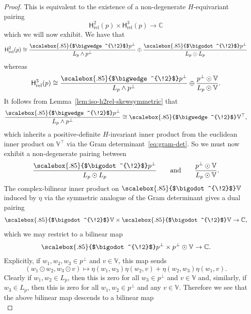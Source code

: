 \documentclass[11pt,reqno,a4paper,final]{amsart}
\newcommand\ext[1]{\scalebox{.85}{$\bigwedge^{\!#1}$}}
\newcommand\sym[1]{\scalebox{.85}{$\bigodot^{\!#1}$}}
\theoremstyle{plain}
\theoremstyle{definition}
\newcommand{\Hrel}{\mathsf{H}_{\mathrm{rel}}}
\newcommand{\VV}{\mathbb{V}}
\newcommand{\CC}{\mathbb{C}}
\newcommand{\1}{\mathbb{1}}
\numberwithin{equation}{section}
\begin{document}
\begin{proof}
  This is equivalent to the existence of a non-degenerate
  $H$-equivariant pairing
  \begin{equation}
    \Hrel^2(p) \times \Hrel^3(p) \to \CC
  \end{equation}
  which we will now exhibit.  We have that
  \begin{equation}
    \Hrel^2(p) \cong \dfrac{\ext{2} p^\perp}{L_p \wedge p^\perp} \oplus \dfrac{\sym{2} p^\perp}{L_p \odot L_p}
  \end{equation}
  whereas
  \begin{equation}
    \Hrel^3(p) \cong \dfrac{\ext{2} p^\perp}{L_p \wedge p^\perp} \oplus \dfrac{p^\perp \odot \VV}{L_p \odot \VV}.
  \end{equation}
  It follows from Lemma~\ref{lem:iso-h2rel-skewsymmetric} that
  \begin{equation}
    \dfrac{\ext{2}p^\perp}{L_p \wedge p^\perp} \cong \ext{2} \VV^\top,
  \end{equation}
  which inherits a positive-definite $H$-invariant inner product from
  the euclidean inner product on $\VV^\top$ via the Gram
  determinant~\eqref{eq:gram-det}.  So we must now exhibit a
  non-degenerate pairing between
  \begin{equation}
     \dfrac{\sym{2} p^\perp}{L_p \odot L_p} \qquad\text{and}\qquad
     \dfrac{p^\perp \odot \VV}{L_p \odot \VV}.
  \end{equation}
  The complex-bilinear inner product on $\sym{2}\VV$ induced by $\eta$
  via the symmetric analogue of the Gram determinant gives a dual
  pairing
  \begin{equation}
    \sym{2}\VV \times \sym{2}\VV \to \CC,
  \end{equation}
  which we may restrict to a bilinear map
  \begin{equation}
    \sym{2} p^\perp \times p^\perp \odot \VV \to \CC.
  \end{equation}
  Explicitly, if $w_1,w_2,w_3 \in p^\perp$ and $v \in \VV$, this map
  sends
  \begin{equation}
    (w_1 \odot w_2, w_3 \odot v) \mapsto \eta(w_1,w_3) \eta(w_2,v) + \eta(w_2,w_3) \eta(w_1,v).
  \end{equation}
  Clearly if $w_1, w_2 \in L_p$, then this is zero for all $w_3 \in
  p^\perp$ and $v \in \VV$ and, similarly, if $w_3 \in L_p$, then this
  is zero for all $w_1,w_2 \in p^\perp$ and any $v \in \VV$.  Therefore
  we see that the above bilinear map descends to a bilinear map
  \begin{equation}

\end{equation}
\end{proof}
\end{document}
